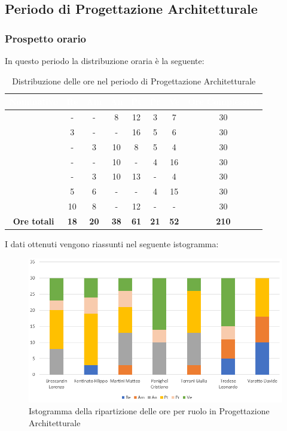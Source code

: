 \subsection{Periodo di Progettazione Architetturale}
\subsubsection{Prospetto orario}
In questo periodo la distribuzione oraria è la seguente:
\begin{table}[H]
	\begin{center}
		\begin{tabular}{ |c c c c c c c c| }
		\rowcolor{darkblue} 
		\textcolor{white}{\textbf{Nominativo}} & \textcolor{white}{\textbf{Re}} & \textcolor{white}{\textbf{Am}} & \textcolor{white}{\textbf{An}} & \textcolor{white}{\textbf{Pt}} & \textcolor{white}{\textbf{Pr}} & \textcolor{white}{\textbf{Ve}} & \textcolor{white}{\textbf{Ore Complessive}} \\ \hline
		\BL 	& -  	& -  	& 8 	& 12 	& 3 	& 7 	& 30 \\ \hline
		\FF 	& 3  	& -  	& - 	& 16 	& 5 	& 6  	& 30 \\ \hline
		\MM 	& -  	& 3  	& 10 	& 8 	& 5 	& 4  	& 30 \\ \hline
		\PC 	& - 	& -  	& 10 	& - 	& 4 	& 16 	& 30 \\ \hline
		\TG 	& -  	& 3 	& 10 	& 13 	& - 	& 4 	& 30 \\ \hline
		\TL 	& 5  	& 6 	& - 	& - 	& 4 	& 15 	& 30 \\ \hline
		\VD 	& 10  	& 8  	& - 	& 12 	& - 	& -  	& 30 \\ \hline
		\textbf{Ore totali} & \textbf{18} & \textbf{20} & \textbf{38} & \textbf{61} & \textbf{21} & \textbf{52} & \textbf{210} \\ \hline
		\end{tabular}
	\caption{Distribuzione delle ore nel periodo di Progettazione Architetturale}
	\end{center}
\end{table}
I dati ottenuti vengono riassunti nel seguente istogramma:
\begin{figure}[H]
    \centering
    \includegraphics[scale = 0.70]{Immagini/ArchitetturaIsto.png}
    \caption{Istogramma della ripartizione delle ore per ruolo in Progettazione Architetturale}
    \label{fig:istogramma ripartizione ore, periodo di Progettazione Architetturale}
\end{figure}
\newpage
